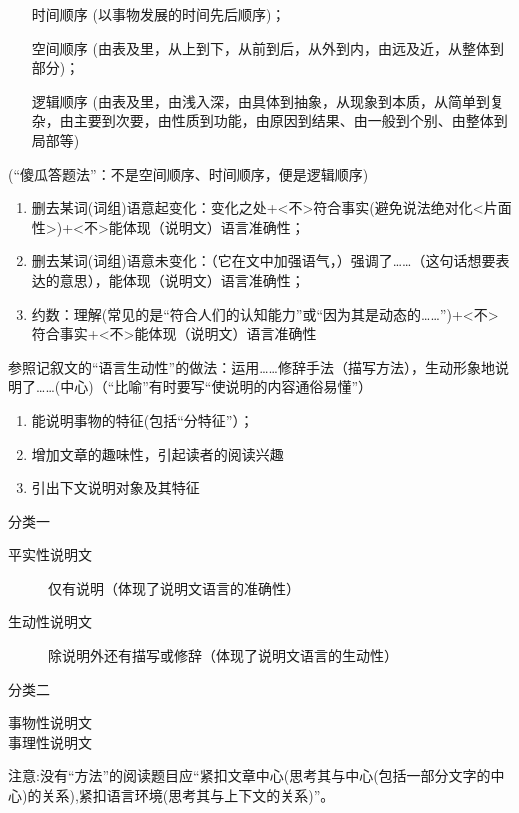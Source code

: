 \begin{itemize}
\item[时间顺序](以事物发展的时间先后顺序)；
\item[空间顺序](由表及里，从上到下，从前到后，从外到内，由远及近，从整体到部分)；
\item[逻辑顺序](由表及里，由浅入深，由具体到抽象，从现象到本质，从简单到复杂，由主要到次要，由性质到功能，由原因到结果、由一般到个别、由整体到局部等)
\end{itemize}
(``傻瓜答题法''：不是空间顺序、时间顺序，便是逻辑顺序)

\begin{enumerate}
\item 删去某词(词组)语意起变化：变化之处+<不>符合事实(避免说法绝对化<片面性>)+<不>能体现（说明文）语言准确性；
\item 删去某词(词组)语意未变化：（它在文中加强语气，）强调了\ldots{}\ldots{}（这句话想要表达的意思），能体现（说明文）语言准确性；
\item 约数：理解(常见的是``符合人们的认知能力''或``因为其是动态的\ldots{}\ldots{}'')+<不>符合事实+<不>能体现（说明文）语言准确性
\end{enumerate}
参照记叙文的``语言生动性''的做法：运用\ldots{}\ldots{}修辞手法（描写方法），生动形象地说明了\ldots{}\ldots{}(中心)（``比喻''有时要写``使说明的内容通俗易懂''）
\begin{enumerate}
\item 能说明事物的特征(包括``分特征''）；
\item 增加文章的趣味性，引起读者的阅读兴趣
\item 引出下文说明对象及其特征
\end{enumerate}

分类一
\begin{description}
\item[平实性说明文]仅有说明（体现了说明文语言的准确性）
\item[生动性说明文]除说明外还有描写或修辞（体现了说明文语言的生动性）
\end{description}
分类二
\begin{description}
\item[事物性说明文]
\item[事理性说明文]
\end{description}

注意:没有``方法''的阅读题目应``紧扣文章中心(思考其与中心(包括一部分文字的中心)的关系),紧扣语言环境(思考其与上下文的关系)''。
\label{main} 